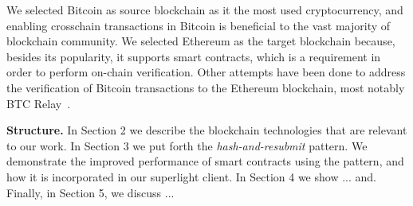 We selected Bitcoin as source blockchain as it the most used cryptocurrency,
and enabling crosschain transactions in Bitcoin is beneficial to the vast
majority of blockchain community. We selected Ethereum as the target blockchain
because, besides its popularity, it supports smart contracts, which is a
requirement in order to perform on-chain verification. Other attempts have been
done to address the verification of Bitcoin transactions to the Ethereum
blockchain, most notably BTC Relay~\cite{btcrelay}.

\noindent

\textbf{Structure.} In Section 2 we describe the blockchain technologies that
are relevant to our work. In Section 3 we put forth the
\emph{hash-and-resubmit} pattern. We demonstrate the improved performance of
smart contracts using the pattern, and how it is incorporated in our superlight
client. In Section 4 we show ... and.  Finally, in Section 5, we discuss ...
